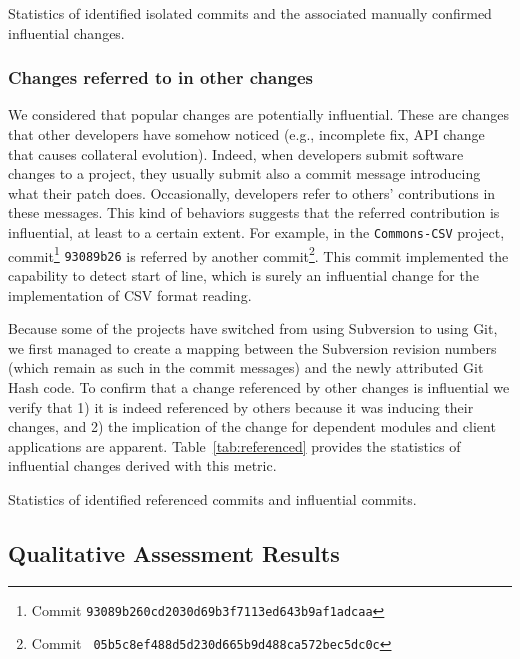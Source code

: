 \begin{table}[t]
\centering
\caption{Statistics of identified isolated commits and the associated manually confirmed influential changes.}

\label{tab:isolated}
\end{table}


\subsubsection{Changes referred to in other changes}
We considered that popular changes are potentially influential.
These are changes that other developers have somehow noticed (e.g., incomplete fix,
API change that causes collateral evolution). Indeed,
when developers submit software changes to a project, they usually submit
also a commit message introducing what their patch does. Occasionally,
developers refer to others' contributions in these messages. This kind of
behaviors suggests that the referred contribution is influential, at
least to a certain extent. For example, in the {\tt Commons-CSV} project, 
commit\footnote{Commit \tt\small 93089b260cd2030d69b3f7113ed643b9af1adcaa} 
{\tt 93089b26} is referred by another commit\footnote{Commit \tt\small
05b5c8ef488d5d230d665b9d488ca572bec5dc0c}.
This commit implemented the capability to detect start of line, 
which is surely an influential change for the implementation of CSV format reading.

Because some of the projects have switched from
using Subversion to using Git, we first managed to create a mapping between
the Subversion revision numbers (which remain as such in the commit messages) and
the newly attributed Git Hash code. 
To confirm that a change referenced by other changes is influential we verify that 1) it is indeed referenced by 
others because it was inducing their changes, and 2) the implication of the change for dependent modules and client applications
are apparent. Table~\ref{tab:referenced} provides the
statistics of influential changes derived with this metric.


\begin{table}[t!]
\centering
\caption{Statistics of identified referenced commits and influential commits.}

\label{tab:referenced}
\end{table}


\subsection{Qualitative Assessment Results}

